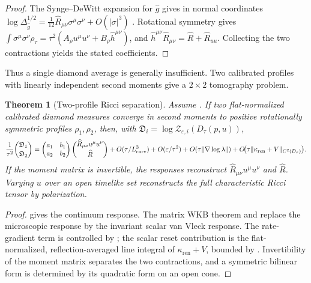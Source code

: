 \documentclass[11pt]{article}
\newtheorem{theorem}{Theorem}[section]
\theoremstyle{definition}
\theoremstyle{remark}
\newcommand{\eps}{\varepsilon}
\newcommand{\ren}{\mathrm{ren}}
\newcommand{\wideg}{\widehat g}
\newcommand{\kren}{\kappa_{\ren}}
\begin{document}
\begin{proof}
The Synge--DeWitt expansion for $\wideg$ gives in normal coordinates
$\log\Delta_{\wideg}^{1/2}
 =\tfrac1{12}\widehat R_{\mu\nu}\sigma^\mu\sigma^\nu
 +O(|\sigma|^3)$ \cite{Synge,DeWitt,VisserVanVleck}.  Rotational symmetry gives
$\int\sigma^\mu\sigma^\nu\rho_\tau
 =\tau^2(A_\rho u^\mu u^\nu+B_\rho\widehat h^{\mu\nu})$, and
$\widehat h^{\mu\nu}\widehat R_{\mu\nu}
 =\widehat R+\widehat R_{uu}$.  Collecting the two contractions yields the
stated coefficients.
\end{proof}

Thus a single diamond average is generally insufficient.  Two calibrated
profiles with linearly independent second moments give a $2\times2$ tomography
problem.

\begin{theorem}[Two-profile Ricci separation]
\label{thm:ricci}
Assume .  If two flat-normalized calibrated diamond measures
converge in second moments to positive rotationally symmetric profiles
$\rho_1,\rho_2$, then, with
$\mathfrak D_i=\log\mathcal Z_{\eps,i}(D_\tau(p,u))$,
\[
 \frac1{\tau^2}\binom{\mathfrak D_1}{\mathfrak D_2}
 =\begin{pmatrix}a_1&b_1\\a_2&b_2\end{pmatrix}
  \binom{\widehat R_{\mu\nu}u^\mu u^\nu}{\widehat R}
 +O(\tau/L_{\rm curv}^3)+O(\eps/\tau^2)
 +O(\tau\|\nabla\log\lambda\|)
+O\!\bigl(\tau\|\kappa_{\ren}+V\|_{C^2(D_\tau)}\bigr).
\]
If the moment matrix is invertible, the responses reconstruct
$\widehat R_{\mu\nu}u^\mu u^\nu$ and $\widehat R$.  Varying $u$ over an open
timelike set reconstructs the full characteristic Ricci tensor by polarization.
\end{theorem}

\begin{proof}
 gives the continuum response.  The matrix WKB theorem and
 replace the microscopic response by the invariant
scalar van Vleck response.  The rate-gradient term is controlled by
; the scalar reset contribution is the
flat-normalized, reflection-averaged line integral of \(\kren+V\), bounded by
.  Invertibility of the moment matrix separates the two contractions, and a
symmetric bilinear form is determined by its quadratic form on an open cone.
\end{proof}
\end{document}
